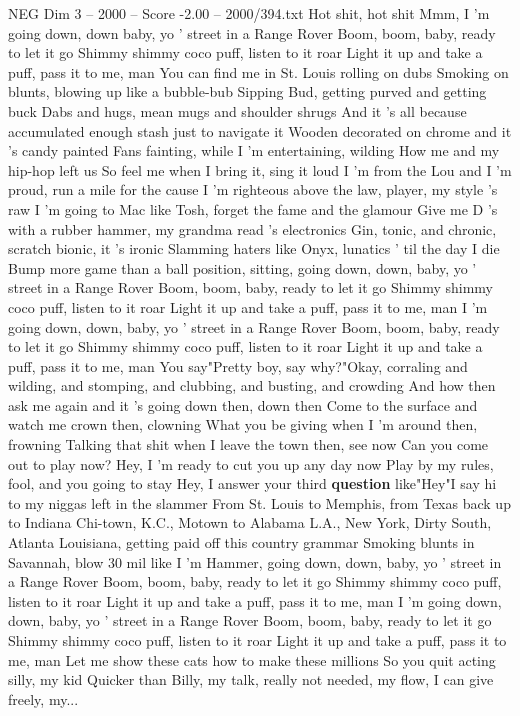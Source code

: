 \begin{textsample}{NEG Dim 3 – 2000 – Score -2.00 – 2000/394.txt}  \label{ex:f3_neg_009}
Hot shit, hot shit Mmm, I 'm going down, down baby, yo ' street in a Range Rover Boom, boom, baby, ready to let it go Shimmy shimmy coco puff, listen to it roar Light it up and take a puff, pass it to me, man You can find me in St.
Louis rolling on dubs Smoking on blunts, blowing up like a bubble-bub Sipping Bud, getting purved and getting buck Dabs and hugs, mean mugs and shoulder shrugs And it 's all because accumulated enough stash just to navigate it Wooden decorated on chrome and it 's candy painted Fans fainting, while I 'm entertaining, wilding How me and my hip-hop left us So feel me when I bring it, sing it loud I 'm from the Lou and I 'm proud, run a mile for the cause I 'm righteous above the law, player, my style 's raw I 'm going to Mac like Tosh, forget the fame and the glamour Give me D 's with a rubber hammer, my grandma read 's electronics Gin, tonic, and chronic, scratch bionic, it 's ironic Slamming haters like Onyx, lunatics ' til the day I die Bump more game than a ball position, sitting, going down, down, baby, yo ' street in a Range Rover Boom, boom, baby, ready to let it go Shimmy shimmy coco puff, listen to it roar Light it up and take a puff, pass it to me, man I 'm going down, down, baby, yo ' street in a Range Rover Boom, boom, baby, ready to let it go Shimmy shimmy coco puff, listen to it roar Light it up and take a puff, pass it to me, man You say"Pretty boy, say why?"Okay, corraling and wilding, and stomping, and clubbing, and busting, and crowding And how then ask me again and it 's going down then, down then Come to the surface and watch me crown then, clowning What you be giving when I 'm around then, frowning Talking that shit when I leave the town then, see now Can you come out to play now?
Hey, I 'm ready to cut you up any day now Play by my rules, fool, and you going to stay Hey, I answer your third \textbf{question} like"Hey"I say hi to my niggas left in the slammer From St.
Louis to Memphis, from Texas back up to Indiana Chi-town, K.C., Motown to Alabama L.A., New York, Dirty South, Atlanta Louisiana, getting paid off this country grammar Smoking blunts in Savannah, blow 30 mil like I 'm Hammer, going down, down, baby, yo ' street in a Range Rover Boom, boom, baby, ready to let it go Shimmy shimmy coco puff, listen to it roar Light it up and take a puff, pass it to me, man I 'm going down, down, baby, yo ' street in a Range Rover Boom, boom, baby, ready to let it go Shimmy shimmy coco puff, listen to it roar Light it up and take a puff, pass it to me, man Let me show these cats how to make these millions So you quit acting silly, my kid Quicker than Billy, my talk, really not needed, my flow, I can give freely, my...

\end{textsample}
